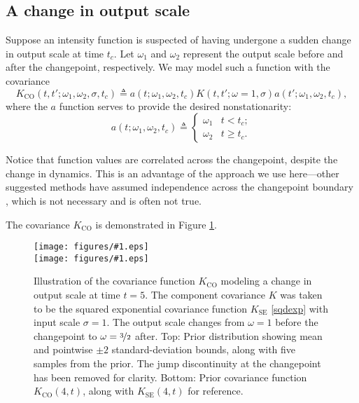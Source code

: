 \documentclass{article}
\newcommand{\deq}{\triangleq}
\newcommand{\psff}[1]{\texttt{[image: figures/\#1.eps]}}
\begin{document}
\subsection{A change in output scale}

Suppose an intensity function is suspected of having undergone a
sudden change in output scale at time $t_c$.  Let $\omega_1$ and
$\omega_2$ represent the output scale before and after the changepoint,
respectively.  We may model such a function with the covariance
\begin{equation*}
  K_{\text{CO}}(t, t'; \omega_1, \omega_2, \sigma, t_c)
  \deq 
  a(t; \omega_1, \omega_2, t_c)
  K(t, t'; \omega = 1, \sigma)
  a(t'; \omega_1, \omega_2, t_c),
\end{equation*}
where the $a$ function serves to provide the desired nonstationarity:
\begin{equation}
  \label{outchange}
  a(t; \omega_1, \omega_2, t_c) 
  \deq
  \begin{cases}
    \omega_1 & t < t_c; \\
    \omega_2 & t \geq t_c.
  \end{cases}
\end{equation}

Notice that function values are correlated across the changepoint,
despite the change in dynamics.  This is an advantage of the approach
we use here---other suggested methods have assumed independence
across the changepoint boundary \citep{adamscp, bocpd}, which is not
necessary and is often not true.

The covariance $K_{\text{CO}}$ is demonstrated in Figure
\ref{fig:changeoutput}.

\begin{figure}
  \centering
   \psff{changepointcovsamples3} \\
  \bigskip
  \psff{changepointcov3}\medskip
  \caption{Illustration of the covariance function $K_{\text{CO}}$
    modeling a change in output scale at time $t = \text{5}$.  The
    component covariance $K$ was taken to be the squared exponential
    covariance function $K_{\text{SE}}$ \eqref{sqdexp} with input
    scale $\sigma = {1}$.  The output scale changes from $\omega
    = {1}$ before the changepoint to $\omega = \nicefrac{3}{2}$
    after. Top: Prior distribution showing mean and pointwise $\pm
    {2}$ standard-deviation bounds, along with five samples from
    the prior.  The jump discontinuity at the changepoint has been
    removed for clarity.  Bottom: Prior covariance function
    $K_{\text{CO}}(4, t)$, along with $K_{\text{SE}}(4, t)$ for
    reference.  }
  \label{fig:changeoutput}
\end{figure}
\end{document}
